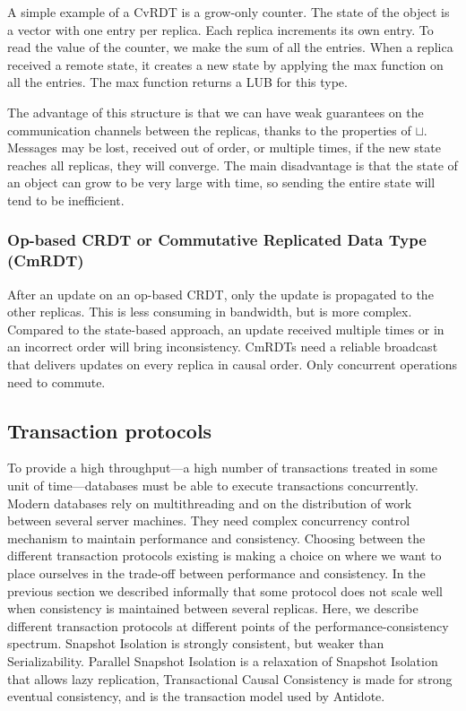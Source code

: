 \documentclass[11pt]{article}
\begin{document}
A simple example of a CvRDT is a grow-only counter. The state of the object is
a vector with one entry per replica. Each replica increments its own entry. To
read the value of the counter, we make the sum of all the entries. When a
replica received a remote state, it creates a new state by applying the max
function on all the entries. The max function returns a LUB for this type.

The advantage of this structure is that we can have weak guarantees on the
communication channels between the replicas, thanks to the properties of
$\sqcup$. Messages may be lost, received out of order, or multiple times, if
the new state reaches all replicas, they will converge. The main disadvantage
is that the state of an object can grow to be very large with time, so sending
the entire state will tend to be inefficient.


\subsubsection{Op-based CRDT or Commutative Replicated Data Type (CmRDT)}

After an update on an op-based CRDT, only the update is propagated to the
other replicas. This is less consuming in bandwidth, but is more complex.
Compared to the state-based approach, an update received multiple times or in
an incorrect order will bring inconsistency. CmRDTs need a reliable broadcast
that delivers updates on every replica in causal order. Only concurrent
operations need to commute.


\subsection{Transaction protocols}
To provide a high throughput---a high number of transactions treated in some
unit of time---databases must be able to execute transactions concurrently.
Modern databases rely on multithreading and on the distribution of work
between several server machines. They need complex concurrency control
mechanism to maintain performance and consistency. Choosing between the
different transaction protocols existing is making a choice on where we want
to place ourselves in the trade-off between performance and consistency. In
the previous section we described informally that some protocol does not scale
well when consistency is maintained between several replicas. Here, we
describe different transaction protocols at different points of the
performance-consistency spectrum. Snapshot Isolation is strongly consistent,
but weaker than Serializability. Parallel Snapshot Isolation is a relaxation
of Snapshot Isolation that allows lazy replication, Transactional Causal
Consistency is made for strong eventual consistency, and is the transaction
model used by Antidote.
\end{document}
